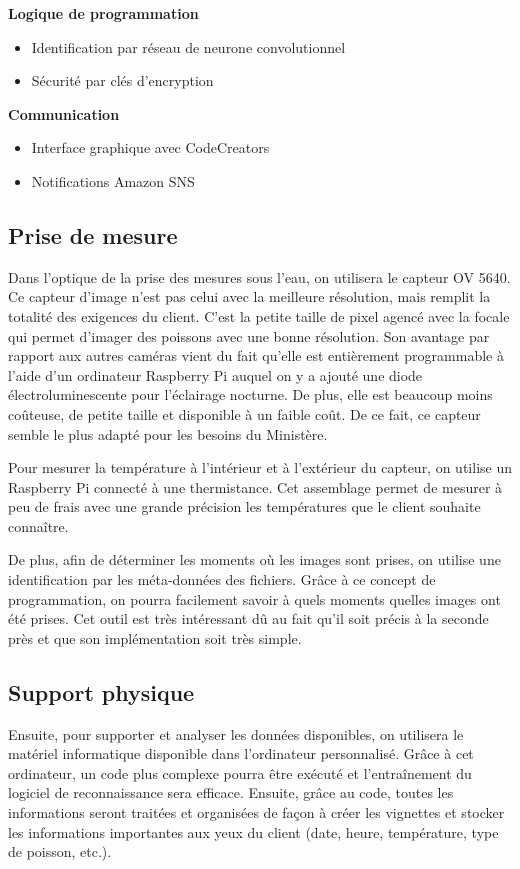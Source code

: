 \textbf{Logique de programmation}
\begin{itemize}
    \item Identification par réseau de neurone convolutionnel
    \item Sécurité par clés d'encryption
\end{itemize}

\textbf{Communication}
\begin{itemize}
    \item Interface graphique avec CodeCreators
    \item Notifications Amazon SNS
\end{itemize}

\clearpage

\subsection{Prise de mesure}
Dans l'optique de la prise des mesures sous l'eau, on utilisera le capteur OV 5640. Ce capteur d'image n'est pas celui avec la meilleure résolution, mais remplit la totalité des exigences du client. C'est la petite taille de pixel agencé avec la focale qui permet d'imager des poissons avec une bonne résolution. Son avantage par rapport aux autres caméras vient du fait qu'elle est entièrement programmable à l'aide d'un ordinateur Raspberry Pi auquel on y a ajouté une diode électroluminescente pour l'éclairage nocturne. De plus, elle est beaucoup moins coûteuse, de petite taille et disponible à un faible coût. De ce fait, ce capteur semble le plus adapté pour les besoins du Ministère.
\vspace{5mm}

Pour mesurer la température à l'intérieur et à l'extérieur du capteur, on utilise un Raspberry Pi connecté à une thermistance. Cet assemblage permet de mesurer à peu de frais avec une grande précision les températures que le client souhaite connaître.
\vspace{5mm}

De plus, afin de déterminer les moments où les images sont prises, on utilise une identification par les méta-données des fichiers. Grâce à ce concept de programmation, on pourra facilement savoir à quels moments quelles images ont été prises. Cet outil est très intéressant dû au fait qu'il soit précis à la seconde près et que son implémentation soit très simple.
\vspace{5mm}


\subsection{Support physique}
Ensuite, pour supporter et analyser les données disponibles, on utilisera le matériel informatique disponible dans l'ordinateur personnalisé. Grâce à cet ordinateur, un code plus complexe pourra être exécuté et l'entraînement du logiciel de reconnaissance sera efficace. Ensuite, grâce au code, toutes les informations seront traitées et organisées de façon à créer les vignettes et stocker les informations importantes aux yeux du client (date, heure, température, type de poisson, etc.).
\vspace{5mm}

